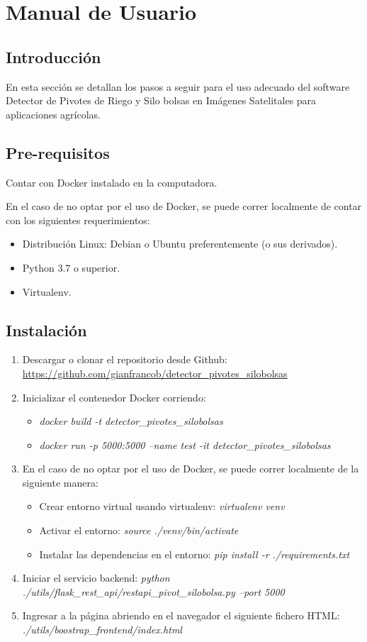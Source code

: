\section{Manual de Usuario}
\subsection{Introducción}
En esta sección se detallan los pasos a seguir para el uso adecuado del software Detector de Pivotes de Riego y Silo bolsas en Imágenes Satelitales para aplicaciones agrícolas.

\subsection{Pre-requisitos}
Contar con Docker instalado en la computadora.

En el caso de no optar por el uso de Docker, se puede correr localmente de contar con los siguientes requerimientos:
\begin{itemize}
    \item Distribución Linux: Debian o Ubuntu preferentemente (o sus derivados).
    \item Python 3.7 o superior.
    \item Virtualenv.
\end{itemize}

\subsection{Instalación}
\begin{enumerate}
    \item Descargar o clonar el repositorio desde Github: \url{https://github.com/gianfrancob/detector_pivotes_silobolsas}
    \item Inicializar el contenedor Docker corriendo: 
    \begin{itemize}
            \item \textit{docker build -t detector\_pivotes\_silobolsas }
            \item \textit{docker run -p 5000:5000 --name test -it detector\_pivotes\_silobolsas}
    \end{itemize}
    
    \item En el caso de no optar por el uso de Docker, se puede correr localmente de la siguiente manera:
    \begin{itemize}
        \item Crear entorno virtual usando virtualenv: \textit{virtualenv venv}
        \item Activar el entorno: \textit{source ./venv/bin/activate}
        \item Instalar las dependencias en el entorno: \textit{pip install -r ./requirements.txt}
    \end{itemize}
    \item Iniciar el servicio backend: \textit{python ./utils/flask\_rest\_api/restapi\_pivot\_silobolsa.py --port 5000}
    \item Ingresar a la página abriendo en el navegador el siguiente fichero HTML: \textit{./utils/boostrap\_frontend/index.html}
\end{enumerate}

